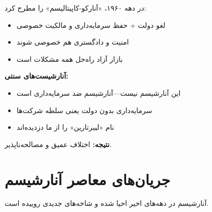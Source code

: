 \begin{debatebox}
در دهه ۱۹۶۰،  «آنارکو-کاپیتالیسم» را مطرح کرد:
\begin{itemize}[nosep]
    \item لغو دولت + حفظ سرمایه‌داری و مالکیت خصوصی
    \item امنیت و دادگستری هم خصوصی شوند
    \item بازار آزاد راه‌حل همه مشکلات است
\end{itemize}

\textbf{آنارشیست‌های سنتی:}
\begin{itemize}[nosep]
    \item این آنارشیسم نیست—آنارشیسم ضد سرمایه‌داری است
    \item سرمایه‌داری بدون دولت یعنی سلطه شرکت‌ها
    \item نام «لیبرتارین» را از ما دزدیده‌اند
\end{itemize}

\textbf{نتیجه:} اختلاف عمیق و مصالحه‌ناپذیر.
\end{debatebox}

\section{جریان‌های معاصر آنارشیسم}

آنارشیسم در دهه‌های اخیر احیا شده و شاخه‌های جدیدی روییده است.

